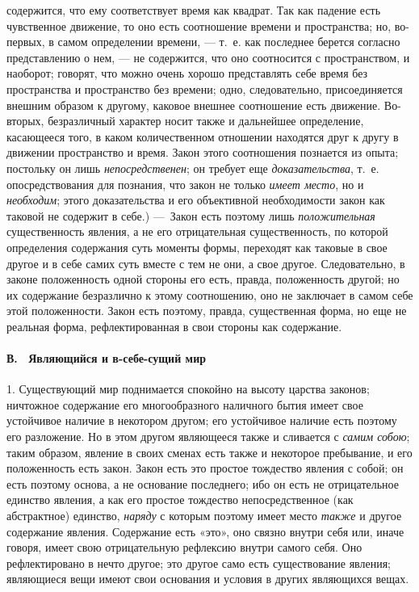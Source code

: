 содержится, что ему соответствует время как квадрат. Так как падение есть
чувственное движение, то оно есть соотношение времени и пространства; но,
во-первых, в самом определении времени, — т.~е. как последнее берется
согласно представлению о нем, — не содержится, что оно соотносится с
пространством, и наоборот; говорят, что можно очень хорошо представлять
себе время без пространства и пространство без времени; одно,
следовательно, присоединяется внешним образом к другому, каковое внешнее
соотношение есть движение. Во-вторых, безразличный характер носит также и
дальнейшее определение, касающееся того, в каком количественном отношении
находятся друг к другу в движении пространство и время. Закон этого
соотношения познается из опыта; постольку он лишь
{\em непосредственен}; он требует еще
{\em доказательства}, т.~е. опосредствования для
познания, что закон не только {\em имеет место}, но и
{\em необходим}; этого доказательства и его объективной
необходимости закон как таковой не содержит в себе.) —~Закон есть поэтому
лишь {\em положительная} существенность явления, а не
его отрицательная существенность, по которой определения содержания суть
моменты формы, переходят как таковые в свое другое и в себе самих суть
вместе с тем не они, а свое другое. Следовательно, в законе положенность
одной стороны его есть, правда, положенность другой; но их содержание
безразлично к этому соотношению, оно не заключает в самом себе этой
положенности. Закон есть поэтому, правда, существенная форма, но еще не
реальная форма, рефлектированная в свои стороны как содержание.

\paragraph[В. \ Являющийся и в{}-себе{}-сущий мир]{В. \ Являющийся и
в-себе-сущий мир}
1. Существующий мир поднимается спокойно на
высоту царства законов; ничтожное содержание его многообразного наличного
бытия имеет свое устойчивое наличие в некотором другом; его устойчивое
наличие есть поэтому его разложение. Но в этом другом являющееся также и
сливается с {\em самим собою}; таким образом, явление в
своих сменах есть также и некоторое пребывание, и его положенность есть
закон. Закон есть это простое тождество явления с собой; он есть поэтому
основа, а не основание последнего; ибо он есть не отрицательное единство
явления, а как его простое тождество непосредственное (как абстрактное)
единство, {\em наряду} с которым поэтому имеет место
{\em также} и другое содержание явления. Содержание
есть «это», оно связно внутри себя или, иначе говоря, имеет свою
отрицательную рефлексию внутри самого себя. Оно рефлектировано в нечто
другое; это другое само есть существование явления; являющиеся вещи имеют
свои основания и условия в других являющихся вещах.

